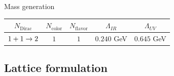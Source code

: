 \documentclass[9pt, handout, aspectratio=169]{beamer}	%
\begin{document}
\begin{frame}[allowframebreaks]{Mass generation}
	\vspace{-1em}

	\begin{table}[!bp]
	  \centering
	  \label{tab:NJL1-analytical-solution-parameters}
	  \begin{tabular}{ c c c c c }
	    \hline
	    $N_\text{Dirac}$ & $N_\text{color}$ & $N_\text{flavor}$ &
	    $\Lambda_{IR}$ & $\Lambda_{UV}$ \\
	    \hline
	    \hline
	    $1+1 \rightarrow 2$ & $1$ & $1$ & $0.240$ GeV & $0.645$ GeV \\
	    \hline
	  \end{tabular}
	\end{table}

\end{frame}


\subsection{Lattice formulation}
\end{document}
